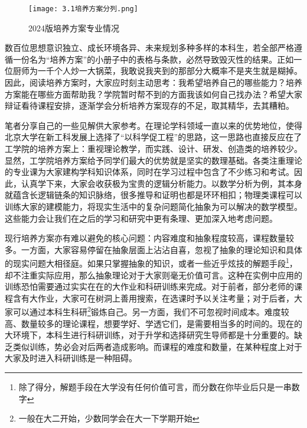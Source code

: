 \documentclass[11pt,oneside]{book}
\begin{document}
\begin{figure}[htbp]
    \centering
    \texttt{[image: 3.1培养方案分列.png]}
    \renewcommand{\figurename}{图}
    \caption{2024版培养方案专业情况}
    \label{fig:enter-label}
\end{figure}


\vspace{20pt}

数百位思想意识独立、成长环境各异、未来规划多种多样的本科生，若全部严格遵循一份名为“培养方案”的小册子中的表格与条款，必然导致毁灭性的结果。正如一位厨师为一千个人炒一大锅菜，我敢说我夹到的那部分大概率不是夹生就是糊掉。因此，阅读培养方案时，大家应时刻主动思考：我希望培养自己的哪些能力？培养方案能在哪些方面帮助我？学院暂时帮不到的方面我该如何自己找办法？希望大家辩证看待课程安排，逐渐学会分析培养方案现存的不足，取其精华，去其糟粕。

\vspace{20pt}

笔者分享自己的一些见解供大家参考。在理论学科领域一直以来的优势地位，使得北京大学在新工科发展上选择了“以科学促工程”的思路，这一思路也直接反应在了工学院的培养方案上：重视理论教学，而实践、设计、研发、创造类的培养较少。显然，工学院培养方案给予同学们最大的优势就是坚实的数理基础。各类注重理论的专业课为大家建构学科知识体系，同时在学习过程中包含了不少练习和考试。因此，认真学下来，大家会收获极为宝贵的逻辑分析能力。以数学分析为例，其本身就蕴含长逻辑链条的知识脉络，很多推导和证明也都是环环相扣；物理类课程可以训练大家的建模能力，将现实生活中的复杂问题简化抽象为可以解决的数学模型。这些能力会让我们在之后的学习和研究中更有条理、更加深入地考虑问题。

\vspace{20pt}

现行培养方案亦有难以避免的核心问题：内容难度和抽象程度较高，课程数量较多。一方面，大家容易停留在抽象层面上沾沾自喜，忽视了抽象的理论知识和具体的现实问题大相径庭。如果只掌握抽象的知识，或者一些近乎炫技的解题手段\footnote{除了得分，解题手段在大学没有任何价值可言，而分数在你毕业后只是一串数字}，却不注重实际应用，那么抽象理论对于大家则毫无价值可言。这种在实例中应用的训练恐怕需要通过实实在在的大作业和科研训练来完成。对于前者，部分老师的课程含有大作业，大家可在树洞上善用搜索，在选课时予以关注考量；对于后者，大家可以通过本科生科研\footnote{一般在大二开始，少数同学会在大一下学期开始}锻炼自己。另一方面，我们不可忽视时间成本。难度较高、数量较多的理论课程，想要学好、学透它们，是需要相当多的时间的。现在的大环境下，本科生进行科研训练，对于升学和选择研究生导师都是十分重要的。缺乏类似训练，势必会对后两者造成影响。而课程的难度和数量，在某种程度上对于大家及时进入科研训练是一种阻碍。
\end{document}
